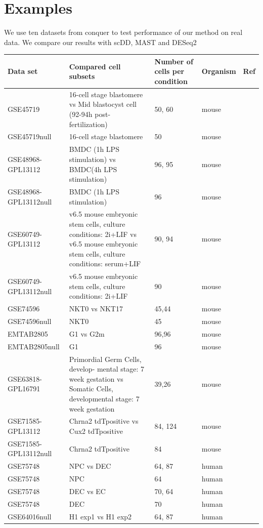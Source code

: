 \documentclass[11pt]{amsart}
\begin{document}
\section{Examples}
We use ten datasets from conquer\cite{ref:Cq} to test performance of our method on real data. We compare our results with scDD\cite{ref:scDD}, MAST\cite{ref:MAST} and DESeq2\cite{ref:Des}\\
\begin{center}
\begin{tabular}{ |p{3cm}|p{6cm}|p{2cm}|p{2cm}|p{1cm}|}
\hline
 Data set & Compared cell subsets & Number of cells per condition & Organism & Ref\\
 \hline
 \hline
 GSE45719 & 16-cell stage blastomere vs Mid blastocyst cell (92-94h post- fertilization) & 50, 60 & mouse & \cite{Deng193}\\
 \hline
 GSE45719null &  16-cell stage blastomere & 50 & mouse &  \cite{Deng193}\\
 \hline
 GSE48968-GPL13112 & BMDC (1h LPS stimulation) vs BMDC(4h LPS stimulation) & 96, 95 & mouse & \cite{Shalek}\\
 \hline
 GSE48968-GPL13112null & BMDC (1h LPS stimulation) & 96 & mouse & \cite{Shalek}\\
 \hline
 GSE60749-GPL13112 & v6.5 mouse embryonic stem cells, culture conditions: 2i+LIF vs v6.5 mouse embryonic stem cells, culture conditions: serum+LIF & 90, 94 & mouse & \cite{Kumar}\\
 \hline
 GSE60749-GPL13112null & v6.5 mouse embryonic stem cells, culture conditions: 2i+LIF & 90 & mouse & \cite{Kumar}\\
 \hline
 GSE74596 & NKT0 vs NKT17 & 45,44 & mouse & \cite{Engel}\\
 \hline
 GSE74596null & NKT0 & 45 & mouse & \cite{Engel}\\
 \hline
 
 EMTAB2805 & G1 vs G2m & 96,96 & mouse & \cite{EMTAB}\\
 \hline
 EMTAB2805null & G1 & 96 & mouse & \cite{EMTAB}\\
 \hline
 GSE63818-GPL16791 & Primordial Germ Cells, develop- mental stage: 7 week gestation vs Somatic Cells, developmental stage: 7 week gestation & 39,26 & mouse & \cite{Guo}\\
 \hline
 GSE71585-GPL13112 & Chrna2 tdTpositive vs Cux2 tdTpositive & 84, 124 & mouse & \cite{Tasic}\\
 \hline
GSE71585-GPL13112null & Chrna2 tdTpositive & 84 & mouse & \cite{Tasic}\\
\hline
GSE75748 & NPC vs DEC & 64, 87 & human & \cite{chu}\\
\hline
GSE75748 & NPC & 64 & human & \cite{chu}\\
\hline
GSE75748 & DEC vs EC & 70, 64 & human & \cite{chu}\\
\hline
GSE75748 & DEC & 70 & human & \cite{chu}\\
\hline
GSE64016null & H1 exp1 vs H1 exp2 & 64, 87 & human & \cite{oscope}\\
\hline
\end{tabular}
\end{center}
\end{document}
